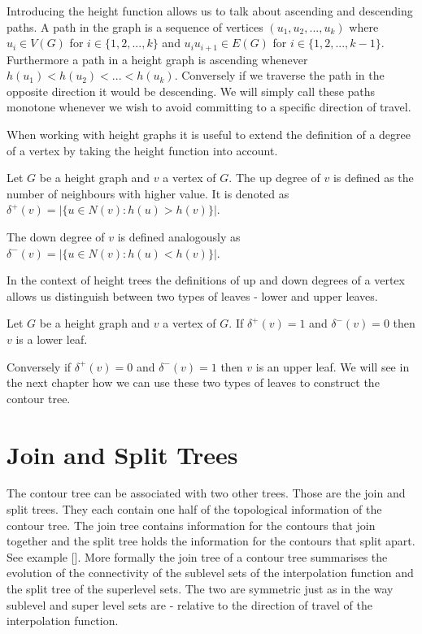 
Introducing the height function allows us to talk about ascending and descending paths. A path in the graph is a sequence of vertices $(u_1, u_2, ... , u_k)$ where $u_i \in V(G)$ for $i \in \{1, 2, ..., k\}$ and $u_iu_{i+1} \in E(G)$ for $i \in \{1, 2, ..., k-1\}$. Furthermore a path in a height graph is ascending whenever $h(u_1) < h(u_2) < ... < h(u_k)$. Conversely if we traverse the path in the opposite direction it would be descending. We will simply call these paths monotone whenever we wish to avoid committing to a specific direction of travel.

When working with height graphs it is useful to extend the definition of a degree of a vertex by taking the height function into account.

\begin{defn} Let $G$ be a height graph and $v$ a vertex of $G$. The up degree of $v$ is defined as the number of neighbours with higher value. It is denoted as $\delta^+(v) = \big|\{ u \in N(v) : h(u) > h(v) \}\big|$.   \end{defn}

The down degree of $v$ is defined analogously as $\delta^-(v) = \big|\{ u \in N(v) : h(u) < h(v) \}\big|$. 

In the context of height trees the definitions of up and down degrees of a vertex allows us distinguish between two types of leaves - lower and upper leaves.

\begin{defn} Let $G$ be a height graph and $v$ a vertex of $G$. If  $\delta^+(v) = 1$ and $\delta^-(v) = 0$ then $v$ is a lower leaf.  \end{defn}

Conversely if $\delta^+(v) = 0$ and $\delta^-(v) = 1$ then $v$ is an upper leaf. We will see in the next chapter how we can use these two types of leaves to construct the contour tree.

\section{Join and Split Trees}

The contour tree can be associated with two other trees. Those are the join and split trees. They each contain one half of the topological information of the contour tree. The join tree contains information for the contours that join together and the split tree holds the information for the contours that split apart. See example []. More formally the join tree of a contour tree summarises the evolution of the connectivity of the sublevel sets of the interpolation function and the split tree of the superlevel sets. The two are symmetric just as in the way sublevel and super level sets are - relative to the direction of travel of the interpolation function.

